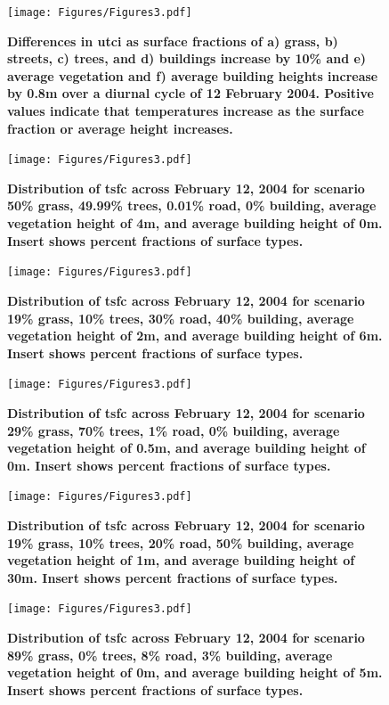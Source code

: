 \documentclass[final,3p,times,authoryear]{elsarticle}
\begin{document}
\begin{figure}
\centering
\texttt{[image: Figures/Figures3.pdf]}
\caption{\bf Differences in \gls{utci} as surface fractions of a) grass, b) streets, c) trees, and d) buildings increase by 10\% and e) average vegetation and f) average building heights increase by 0.8m over a diurnal cycle of 12 February 2004. Positive values indicate that temperatures increase as the surface fraction or average height increases. }
 \label{fig:r2parametersutci}
\end{figure}

\begin{figure}
\centering
\texttt{[image: Figures/Figures3.pdf]}
\caption{\bf Distribution of \gls{tsfc} across February 12, 2004 for scenario 50\% grass, 49.99\% trees, 0.01\% road, 0\% building, average vegetation height of 4m, and average building height of 0m. Insert shows percent fractions of surface types.}
 \label{fig:dist1}
\end{figure}


\begin{figure}
\centering
\texttt{[image: Figures/Figures3.pdf]}
\caption{\bf Distribution of \gls{tsfc} across February 12, 2004 for scenario 19\% grass, 10\% trees, 30\% road, 40\% building, average vegetation height of 2m, and average building height of 6m. Insert shows percent fractions of surface types.}
 \label{fig:dist2}
\end{figure}



\begin{figure}
\centering
\texttt{[image: Figures/Figures3.pdf]}
\caption{\bf Distribution of \gls{tsfc} across February 12, 2004 for scenario 29\% grass, 70\% trees, 1\% road, 0\% building, average vegetation height of 0.5m, and average building height of 0m. Insert shows percent fractions of surface types.}
 \label{fig:dist3}
\end{figure}

\begin{figure}
\centering
\texttt{[image: Figures/Figures3.pdf]}
\caption{\bf Distribution of \gls{tsfc} across February 12, 2004 for scenario 19\% grass, 10\% trees, 20\% road, 50\% building, average vegetation height of 1m, and average building height of 30m. Insert shows percent fractions of surface types.}
 \label{fig:dist4}
\end{figure}


\begin{figure}
\centering
\texttt{[image: Figures/Figures3.pdf]}
\caption{\bf Distribution of \gls{tsfc} across February 12, 2004 for scenario 89\% grass, 0\% trees, 8\% road, 3\% building, average vegetation height of 0m, and average building height of 5m. Insert shows percent fractions of surface types.}
 \label{fig:dist5}
\end{figure}
\end{document}
